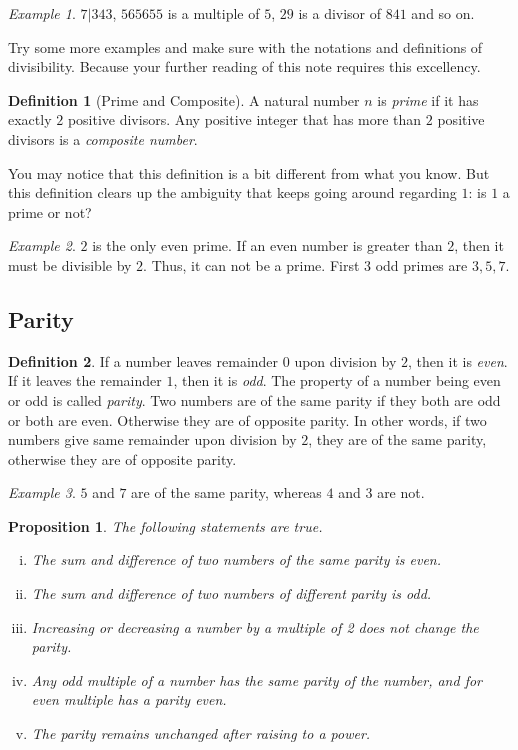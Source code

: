 \documentclass[a4paper, leqno]{article}
\newtheorem{proposition}{Proposition}
\theoremstyle{definition}
\newtheorem{definition}{Definition}
\theoremstyle{remark}
\newtheorem*{example}{Example}
\begin{document}
			\begin{example}
				$7|343$, $565655$ is a multiple of $5$, $29$ is a divisor of $841$ and so on.
			\end{example}
		Try some more examples and make sure with the notations and definitions of divisibility. Because your further reading of this note requires this excellency.
			\begin{definition}[Prime and Composite]
				A natural number $n$ is \textit{prime} if it has exactly $2$ positive divisors. Any positive integer that has more than $2$ positive divisors is a \textit{composite number}.
			\end{definition}
		You may notice that this definition is a bit different from what you know. But this definition clears up the ambiguity that keeps going around regarding $1$: is $1$ a prime or not?
			\begin{example}
				$2$ is the only even prime. If an even number is greater than $2$, then it must be divisible by $2$. Thus, it can not be a prime. First $3$ odd primes are $3, 5, 7$.
			\end{example}
	\subsection{Parity}
		\begin{definition}
			If a number leaves remainder $0$ upon division by $2$, then it is \textit{even}. If it leaves the remainder $1$, then it is  \textit{odd}. The property of a number being even or odd is called \textit{parity}. Two numbers are of the same parity if they both are odd or both are even. Otherwise they are of opposite parity. In other words, if two numbers give same remainder upon division by $2$, they are of the same parity, otherwise they are of opposite parity.
		\end{definition}
		
		\begin{example}
			$5$ and $7$ are of the same parity, whereas $4$ and $3$ are not.
		\end{example}
		
		\begin{proposition}
			The following statements are true.
				\begin{enumerate}[i.]
					\item The sum and difference of two numbers of the same parity is even.
					\item The sum and difference of two numbers of different parity is odd.
					\item Increasing or decreasing a number by a multiple of 2 does not change
					the parity.
					\item Any odd multiple of a number has the same parity of the number, and
					for even multiple has a parity even.
					\item The parity remains unchanged after raising to a power.
				\end{enumerate}
		\end{proposition}
		
\end{document}
